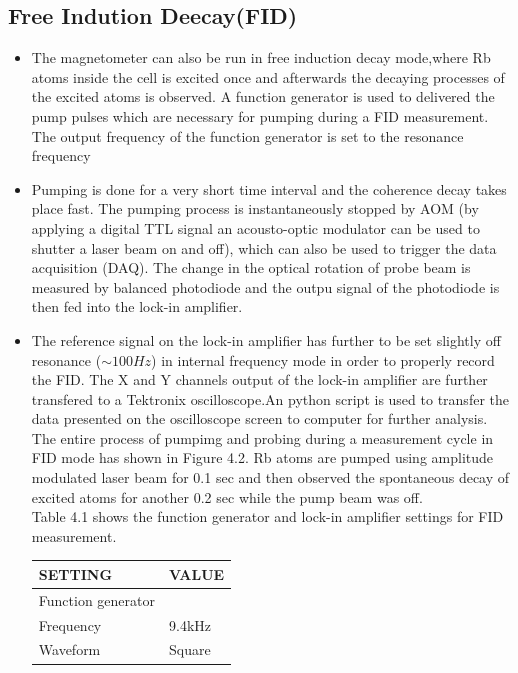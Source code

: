 \documentclass[12pt]{report}
\begin{document}
\subsection{Free Indution Deecay(FID) }
\bigskip
\begin{itemize}
\item The magnetometer can also
be run in free induction decay mode,where Rb atoms inside the cell is excited once and afterwards the decaying processes of the excited atoms is observed. A function generator is used to delivered the pump pulses which are necessary for pumping during a FID measurement. The output frequency of the function generator is set to the resonance frequency
\item Pumping is done for a very short time interval and the coherence decay takes place fast. The pumping process is instantaneously stopped by AOM (by applying a digital TTL signal an acousto-optic modulator can be used to shutter a laser beam on and off), which can also be used to trigger the  data acquisition (DAQ). The change in the optical rotation of probe beam is measured by balanced  photodiode and the outpu signal of the photodiode is then fed into the lock-in amplifier.
\item The reference signal on the lock-in amplifier has further to be set slightly off resonance ($\sim 100 Hz$) in internal frequency mode in order to properly record the FID.
The X and Y channels output of the lock-in amplifier are further transfered to a Tektronix oscilloscope.An python script is used to transfer the data presented on the oscilloscope screen to computer for further analysis. The entire process of pumpimg and probing during a measurement cycle in FID mode  has shown in Figure 4.2. Rb atoms are pumped using amplitude modulated laser beam for 0.1 sec and then observed the spontaneous decay of excited atoms for another 0.2 sec while the pump beam was off. \\
Table 4.1 shows the function generator and lock-in amplifier settings for FID measurement.
\begin{table}[h]
\centering
\begin{tabular}{|l |l|}
\hline

\textbf{ SETTING}    & \textbf{VALUE} \\
\hline
Function generator &   \\
\hline
Frequency & 9.4kHz   \\

Waveform    &  Square  \\


\end{tabular}
\end{table}
\end{itemize}
\end{document}
